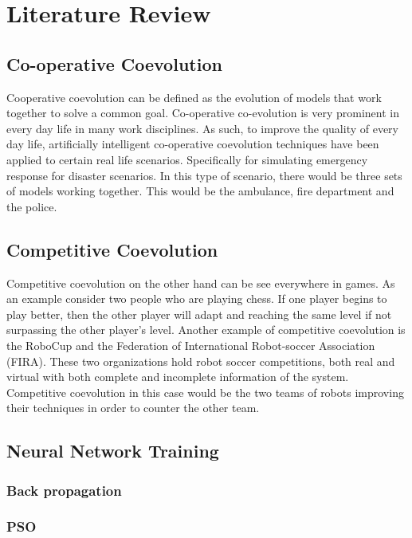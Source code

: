 
\section{Literature Review}

\subsection{Co-operative Coevolution}
 Cooperative coevolution can be defined as the evolution of models that work together to solve a common goal. Co-operative co-evolution is very prominent in every day life in many work disciplines. As such, to improve the quality of every day life, artificially intelligent co-operative coevolution techniques have been applied to certain real life scenarios. Specifically for simulating emergency response for disaster scenarios. In this type of scenario, there would be three sets of models working together. This would be the ambulance, fire department and the police.

\subsection{Competitive Coevolution}
  Competitive coevolution on the other hand can be see everywhere in games. As an example consider two people who are playing chess. If one player begins to play better, then the other player will adapt and reaching the same level if not surpassing the other player's level. Another example of competitive coevolution is the RoboCup and the Federation of International Robot-soccer Association (FIRA)\cite{Scheepers-2013}. These two organizations hold robot soccer competitions, both real and virtual with both complete and incomplete information of the system. Competitive coevolution in this case would be the two teams of robots improving their techniques in order to counter the other team. 

\subsection{Neural Network Training}
\subsubsection{Back propagation}



\subsubsection{PSO}



